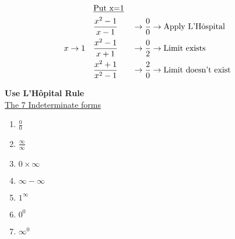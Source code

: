 \begin{minipage}{0.6\textwidth}
    \begin{alignat*}{2}
             & \text{\underline{Put x=1}}\\
             & \frac{x^2-1}{x-1} &&\to \frac{0}{0} \to \text{Apply L'H\^ospital} \\
        x\to1 \quad & \frac{x^2-1}{x+1} &&\to \frac{0}{2} \to \text{Limit exists} \\
             & \frac{x^2+1}{x^2-1} &&\to \frac{2}{0} \to \text{Limit doesn't exist} \\
    \end{alignat*}
\end{minipage}
\begin{minipage}{0.3\textwidth}
    \textbf{Use L'H\^opital Rule}\\
    \underline{The 7 Indeterminate forms} \\
    \begin{enumerate}[(1)]
        \item $\frac{0}{0}$ 
        \item $\frac{\infty}{\infty}$ 
        \item $0 \times \infty$ 
        \item $\infty-\infty$
        \item $1^{\infty}$ 
        \item $0^0$ 
        \item $\infty^0$
    \end{enumerate}
\end{minipage}

